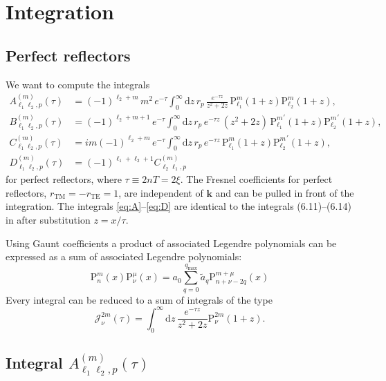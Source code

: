 \documentclass[10pt]{article}
\newcommand{\imag}{i} %
\newcommand{\e}{e}    %
\newcommand{\TE}{\mathrm{TE}}
\newcommand{\TM}{\mathrm{TM}}
\newcommand{\Plm}[2]{{\text{P}_{#1}^{#2}}}
\newcommand{\qmax}{{q_\text{max}}}
\renewcommand{\vec}[1]{{\mathbf{#1}}}
\begin{document}
\section{Integration}

\subsection{Perfect reflectors}

We want to compute the integrals
\begin{align}
\label{eq:A}
A_{\ell_1\ell_2,p}^{(m)}(\tau) &= (-1)^{\ell_2+m} \, m^2 \, \e^{-\tau} \int_0^\infty \mathrm{d}z \, r_p \, \frac{\e^{-\tau z}}{z^2+2z} \, \Plm{\ell_1}{m}(1+z) \Plm{\ell_2}{m}(1+z), \\
\label{eq:B}
B_{\ell_1\ell_2,p}^{(m)}(\tau) &= (-1)^{\ell_2+m+1} \, \e^{-\tau} \int_0^\infty \mathrm{d}z \, r_p \, \e^{-\tau z} \, (z^2+2z) \, \Plm{\ell_1}{m}^\prime(1+z) \Plm{\ell_2}{m}^\prime(1+z), \\
\label{eq:C}
C_{\ell_1\ell_2,p}^{(m)}(\tau) &= \imag m (-1)^{\ell_2+m} \, \e^{-\tau} \int_0^\infty \mathrm{d}z \, r_p \, \e^{-\tau z} \, \Plm{\ell_1}{m}(1+z) \Plm{\ell_2}{m}^\prime(1+z), \\
\label{eq:D}
D_{\ell_1\ell_2,p}^{(m)}(\tau) &= (-1)^{\ell_1+\ell_2+1} C_{\ell_2\ell_1,p}^{(m)}
\end{align}
for perfect reflectors, where $\tau \equiv 2nT=2\xi$. The Fresnel coefficients
for perfect reflectors, $r_\TM=-r_\TE=1$, are independent of $\vec k$ and
can be pulled in front of the integration. The integrals \eqref{eq:A}--\eqref{eq:D}
are identical to the integrals (6.11)--(6.14) in \cite{hartmann} after substitution $z = x/\tau$.

Using Gaunt coefficients a product of associated Legendre polynomials can be
expressed as a sum of associated Legendre polynomials:
\begin{equation}
\Plm{n}{m}(x) \Plm{\nu}{\mu}(x) = a_0 \sum_{q=0}^\qmax \tilde a_q  \Plm{n+\nu-2q}{m+\mu}(x)
\end{equation}
Every integral can be reduced to a sum of integrals of the type
\begin{equation}
\mathcal{J}_\nu^{2m}(\tau) = \int_0^\infty \mathrm{d}z \, \frac{\e^{-\tau z}}{z^2+2z} \Plm{\nu}{2m}\left(1+z\right).
\end{equation}


\subsection{Integral $A_{\ell_1\ell_2,p}^{(m)}(\tau)$}
\end{document}

